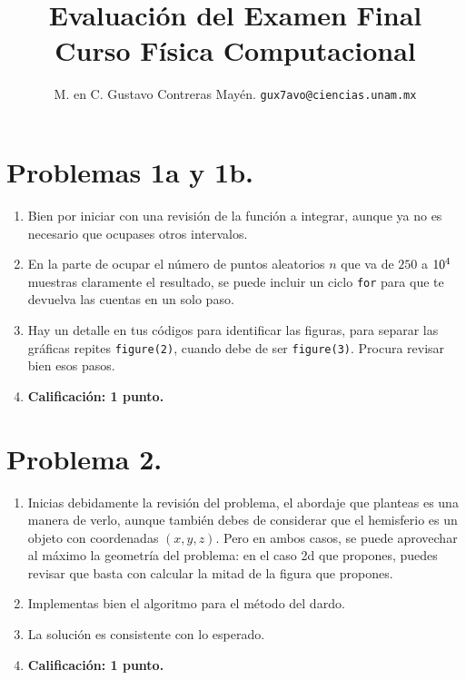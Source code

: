 

\author{M. en C. Gustavo Contreras Mayén. \texttt{gux7avo@ciencias.unam.mx}}
\title{Evaluación del Examen Final \\ {\large Curso Física Computacional}}
\date{ }


\maketitle
\fontsize{14}{14}\selectfont

\section{Problemas 1a y 1b.}

\begin{enumerate}
\item Bien por iniciar con una revisión de la función a integrar, aunque ya no es necesario que ocupases otros intervalos.
\item En la parte de ocupar el número de puntos aleatorios $n$ que va de $250$ a $\num{d4}$ muestras claramente el resultado, se puede incluir un ciclo \texttt{for} para que te devuelva las cuentas en un solo paso.
\item Hay un detalle en tus códigos para identificar las figuras, para separar las gráficas repites \texttt{figure(2)}, cuando debe de ser \texttt{figure(3)}. Procura revisar bien esos pasos.
\item \textbf{Calificación: 1 punto.}
\end{enumerate}

\section{Problema 2.}

\begin{enumerate}
\item Inicias debidamente la revisión del problema, el abordaje que planteas es una manera de verlo, aunque también debes de considerar que el hemisferio es un objeto con coordenadas $(x, y, z)$. Pero en ambos casos, se puede aprovechar al máximo la geometría del problema: en el caso 2d que propones, puedes revisar que basta con calcular la mitad de la figura que propones.
\item Implementas bien el algoritmo para el método del dardo.
\item La solución es consistente con lo esperado.
\item \textbf{Calificación: 1 punto.}
\end{enumerate}

